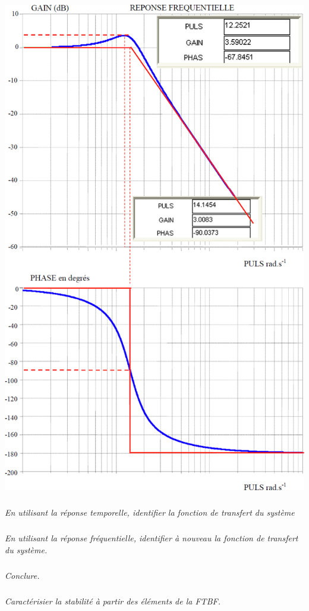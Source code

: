 \documentclass[10pt,fleqn]{article} %
\begin{document}
\begin{multicols}{2}
\begin{center}
\includegraphics[width=\linewidth]{images/fig_03}
\end{center}



\subparagraph*{}\textit{En utilisant la réponse temporelle, identifier la fonction de transfert du système}

\subparagraph*{}\textit{En utilisant la réponse fréquentielle, identifier à nouveau la fonction de transfert du système.}


\subparagraph*{}\textit{Conclure.}

\subparagraph*{}\textit{Caractérisier la stabilité à partir des éléments de la FTBF.}


\end{multicols}
\end{document}
